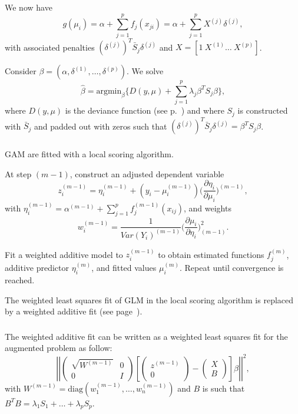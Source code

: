 \documentclass{beamer}
\newcommand{\bs}{\bigskip}
\begin{document}
\begin{frame}
\frametitle{}
We now have
$$g(\mu_i ) =  \alpha+ \sum_{j=1}^p f_j(x_{ji}) = \alpha+ \sum_{j=1}^p X^{(j)} \delta^{(j)},$$
with associated penalties $(\delta^{(j)})^T \bar{S}_j \delta^{(j)}$ and $X
= [1 \  X^{(1)}  \ldots  \ X^{(p)} ]$. 

\bigskip 
Consider $\beta = (\alpha, \delta^{(1)}, \ldots, \delta^{(p)})$. We solve
 $$\hat{\beta} = \mbox{argmin}_{\beta} \{  D(y,\mu)+ \sum_{j=1}^{p} \lambda_j  \beta^T S_j \beta \},$$
where $D(y,\mu)$ is the deviance function (see p.~\pageref{deviance.def}) and  where $S_j$ is constructed with $\bar{S}_j$ and padded out with zeros such that
$(\delta^{(j)})^T \bar{S}_j \delta^{(j)} = \beta^T S_j \beta$.
\end{frame}

\begin{frame}
\frametitle{}
GAM are fitted with a {\color{blue}local scoring algorithm}.

\bigskip
At step $(m-1)$, construct an {\color{blue}adjusted dependent variable}
$$z_i^{(m-1)} = \eta_i^{(m-1)} + (y_i - \mu_i^{(m-1)}) \Big(\frac{\partial \eta_i}{\partial \mu_i} \Big)^{(m-1)},$$
with $\eta_i^{(m-1)} = \alpha^{(m-1)} + \sum_{j=1}^p f_j^{(m-1)}(x_{ij})$, and weights
$$w_i^{(m-1)} = \frac{1}{Var(Y_i)^{(m-1)}}\Big(\frac{\partial \mu_i}{\partial \eta_i} \Big)_{(m-1)}^2.$$

Fit a {\color{blue}weighted additive model} to $z_i^{(m-1)}$ to obtain estimated functions $f_j^{(m)}$, additive predictor $\eta_i^{(m)}$, and fitted values $\mu_i^{(m)}$. Repeat until convergence is reached.


\bs
The weighted least squares fit of GLM in the local scoring
algorithm is replaced by a weighted additive fit (see page~\pageref{IWLSweights}).

\end{frame}


\begin{frame}
\frametitle{}
The weighted additive fit can be written as a weighted least squares fit for the augmented problem as follow:
$$\left|\left|
\left(\begin{array}{cc}
\sqrt{W^{(m-1)}} & 0 \\
0 & I 
\end{array} \right) 
\left[
\left(\begin{array}{c}
z^{(m-1)} \\
0
\end{array} \right) -
\left(\begin{array}{c}
X \\
B
\end{array} \right) \right]\beta
\right|\right|^2,
$$
with $W^{(m-1)} = \mbox{diag}(w_1^{(m-1)}, \ldots,w_n^{(m-1)})$ and $B$ is such that $B^T B = \lambda_1 S_1 + \ldots + \lambda_p S_p.$

\end{frame}
\end{document}
